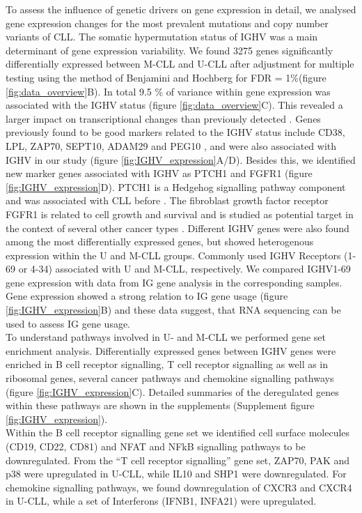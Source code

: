 To assess the influence of genetic drivers on gene expression in detail, we analysed gene expression changes for the most prevalent mutations and copy number variants of CLL. The somatic hypermutation status of IGHV was a main determinant of gene expression variability.  We found 3275 genes significantly differentially expressed between M-CLL and U-CLL after adjustment for multiple testing using the method of Benjamini and Hochberg for FDR = 1\%(figure \ref {fig:data_overview}B). In total 9.5 \% of variance within gene expression was associated with the IGHV status (figure \ref {fig:data_overview}C). This revealed a larger impact on transcriptional changes than previously detected \citep{Ferreira2014a}. Genes previously found to be good markers related to the IGHV status include CD38, LPL, ZAP70, SEPT10, ADAM29 and PEG10 \citep{Kienle2010}, and were also associated with IGHV in our study (figure \ref {fig:IGHV_expression}A/D). Besides this, we identified new marker genes associated with IGHV as PTCH1 and FGFR1 (figure \ref {fig:IGHV_expression}D). PTCH1 is a Hedgehog signalling pathway component and was associated with CLL before \citep{Decker2012}. The fibroblast growth factor receptor FGFR1 is related to cell growth and survival and is studied as potential target in the context of several other cancer types \citep{Zhou2016}. Different IGHV genes were also found among the most differentially expressed genes, but showed heterogenous expression within the U and M-CLL groups. Commonly used IGHV Receptors (1-69 or 4-34) associated with U and M-CLL, respectively. We compared IGHV1-69 gene expression with data from IG gene analysis in the corresponding samples. Gene expression showed a strong relation to IG gene usage (figure \ref {fig:IGHV_expression}B) and these data suggest, that RNA sequencing can be used to assess IG gene usage. \\

To understand pathways involved in U- and M-CLL we performed gene set enrichment analysis. Differentially expressed genes between IGHV genes were enriched in B cell receptor signalling, T cell receptor signalling as well as in ribosomal genes, several cancer pathways and chemokine signalling pathways (figure \ref {fig:IGHV_expression}C). Detailed summaries of the deregulated genes within these pathways are shown in the supplements (Supplement figure \ref {fig:IGHV_expression}). \\ 

Within the B cell receptor signalling gene set we identified cell surface molecules (CD19, CD22, CD81) and NFAT and NFkB signalling pathways to be downregulated. 
From the “T cell receptor signalling” gene set, ZAP70, PAK and p38 were upregulated in U-CLL, while IL10 and SHP1 were downregulated.
For chemokine signalling pathways, we found downregulation of CXCR3 and CXCR4 in U-CLL, while a set of Interferons (IFNB1, INFA21) were upregulated. \\

